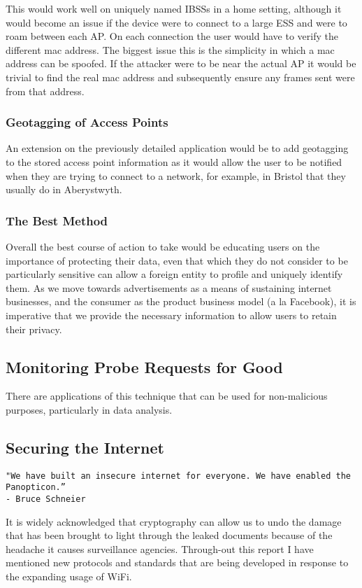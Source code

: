 This would work well on uniquely named IBSSs in a home setting, although it would become an issue if the device were to connect to a large ESS and were to roam between each AP. On each connection the user would have to verify the different mac address. The biggest issue this  is the simplicity in which a mac address can be spoofed. If the attacker were to be near the actual AP it would be trivial to find the real mac address and subsequently ensure any frames sent were from that address.

\subsubsection*{Geotagging of Access Points}
An extension on the previously detailed application would be to add geotagging to the stored access point information as it would allow the user to be notified when they are trying to connect to a network, for example, in Bristol that they usually do in Aberystwyth.

\subsubsection*{The Best Method}
Overall the best course of action to take would be educating users on the importance of protecting their data, even that which they do not consider to be particularly sensitive can allow a foreign entity to profile and uniquely identify them. As we move towards advertisements as a means of sustaining internet businesses, and the consumer as the product business model (a la Facebook), it is imperative that we provide the necessary information to allow users to retain their privacy. 

\subsection{Monitoring Probe Requests for Good}
There are applications of this technique that can be used for non-malicious purposes, particularly in data analysis.

\subsection{Securing the Internet}
\begin{verbatim}
"We have built an insecure internet for everyone. We have enabled the Panopticon.”
- Bruce Schneier
\end{verbatim}
It is widely acknowledged that cryptography can allow us to undo the damage that has been brought to light through the leaked documents because of the headache it causes surveillance agencies. Through-out this report I have mentioned new protocols and standards that are being developed in response to the expanding usage of WiFi.

